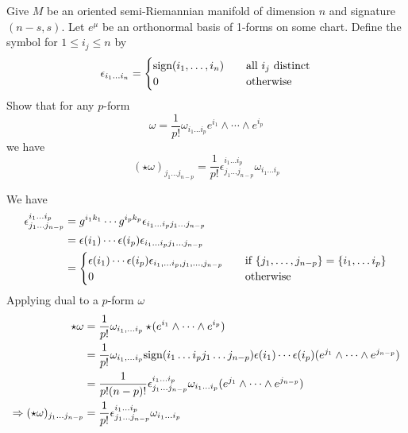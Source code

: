 \documentclass[10pt]{article}
\begin{document}
\begin{example}
	Give $M$ be an oriented semi-Riemannian manifold of dimension $n$ and signature $(n-s,s)$. Let $e^\mu$ be an orthonormal basis of 1-forms on some chart. Define the  symbol for $1 \le i_j \le n$ by
	$$
		\epsilon_{i_1\dots i_n} = \begin{cases}
			\text{sign}(i_1,\dots,i_n) \quad &\text{all $i_j$ distinct}\\
			0 &\text{otherwise}
		\end{cases}
	$$
	Show that for any $p$-form
	$$
		\omega=\frac{1}{p!}\omega_{i_1\dots i_p}e^{i_1} \wedge \cdots \wedge e^{i_p}
	$$
	we have
	$$
		(\star\omega)_{j_1\dots j_{n-p}}=\frac{1}{p!}\epsilon^{i_1\dots i_p}_{j_1\dots j_{n-p}}\omega_{i_1\dots i_p}
	$$
\end{example}
\sol We have
$$
\begin{aligned}
	\epsilon^{i_1\dots i_p}_{j_1\dots j_{n-p}} &= g^{i_1k_1}\cdots g^{i_pk_p} \epsilon_{i_1\dots i_pj_1\dots j_{n-p}}\\
	&= \epsilon(i_1) \cdots \epsilon(i_p) \epsilon_{i_1\dots i_pj_1\dots j_{n-p}}\\
	&= \begin{cases}
		\epsilon(i_1) \cdots \epsilon(i_p) \epsilon_{i_1,\dots i_p,j_1,\dots,j_{n-p}} \quad &\text{if $\lbrace j_1,\dots,j_{n-p}\rbrace = \lbrace i_1,\dots i_p\rbrace$}\\
		0 &\text{otherwise}
	\end{cases}
\end{aligned}
$$
Applying dual to a $p$-form $\omega$
$$
\begin{aligned}
	\star\omega &= \frac{1}{p!} \omega_{i_1,\dots i_p} \star\!(e^{i_1} \wedge \cdots \wedge e^{i_p})\\
	&= \frac{1}{p!} \omega_{i_1,\dots i_p} \text{sign}(i_1\dots i_pj_1\dots j_{n-p}) \epsilon(i_1) \cdots \epsilon(i_p) (e^{j_1} \wedge \cdots \wedge e^{j_{n-p}})\\
	&= \frac{1}{p!(n-p)!} \epsilon^{i_1\dots i_p}_{j_1\dots j_{n-p}}\omega_{i_1\dots i_p} (e^{j_1} \wedge \cdots \wedge e^{j_{n-p}})\\
	\Rightarrow (\star\omega)_{j_1\dots j_{n-p}} &= \frac{1}{p!} \epsilon^{i_1\dots i_p}_{j_1\dots j_{n-p}}\omega_{i_1\dots i_p} 
\end{aligned}
$$
\end{document}
